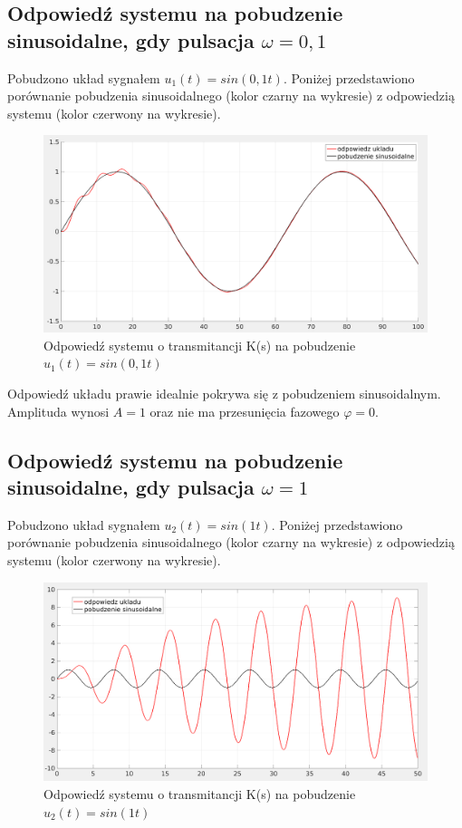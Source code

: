 \documentclass[12pt]{article}
\begin{document}
\subsection{Odpowiedź systemu na pobudzenie sinusoidalne, gdy pulsacja $\omega = 0,1$}
Pobudzono układ sygnałem $u_1(t)=sin(0,1 t)$. Poniżej przedstawiono porównanie pobudzenia sinusoidalnego (kolor czarny na wykresie) z odpowiedzią systemu (kolor czerwony na wykresie).
\begin{figure}[H]
    \centering
    \includegraphics[scale=0.2]{2.1.png}
    \caption{Odpowiedź systemu o transmitancji K(s) na pobudzenie $u_1(t)=sin(0,1 t)$}
\end{figure}

Odpowiedź układu prawie idealnie pokrywa się z pobudzeniem sinusoidalnym. Amplituda wynosi $A=1$ oraz nie ma przesunięcia fazowego $ \varphi=0$.

\subsection{Odpowiedź systemu na pobudzenie sinusoidalne, gdy pulsacja $\omega = 1$}
Pobudzono układ sygnałem $u_2(t)=sin(1 t)$. Poniżej przedstawiono porównanie pobudzenia sinusoidalnego (kolor czarny na wykresie) z odpowiedzią systemu (kolor czerwony na wykresie).
\begin{figure}[H]
    \centering
    \includegraphics[scale=0.2]{2.2.png}
    \caption{Odpowiedź systemu o transmitancji K(s) na pobudzenie $u_2(t)=sin(1 t)$}
    \label{fig:2}
\end{figure}
\end{document}
